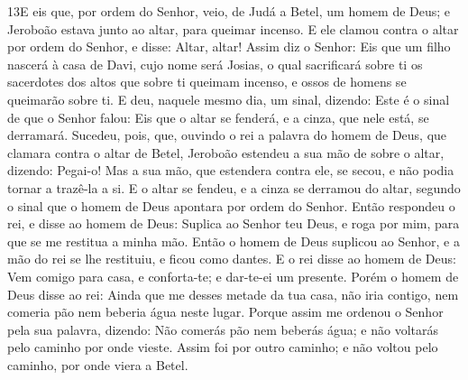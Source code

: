 \medskip

\lettrine{13} E eis que, por ordem do Senhor, veio, de Judá a
Betel, um homem de Deus; e Jeroboão estava junto ao altar, para
queimar incenso. E ele clamou contra o altar por ordem do
Senhor, e disse: Altar, altar! Assim diz o Senhor: Eis que um filho
nascerá à casa de Davi, cujo nome será Josias, o qual sacrificará
sobre ti os sacerdotes dos altos que sobre ti queimam incenso, e
ossos de homens se queimarão sobre ti. E deu, naquele mesmo dia,
um sinal, dizendo: Este é o sinal de que o Senhor falou: Eis que o
altar se fenderá, e a cinza, que nele está, se derramará.
Sucedeu, pois, que, ouvindo o rei a palavra do homem de Deus,
que clamara contra o altar de Betel, Jeroboão estendeu a sua mão de
sobre o altar, dizendo: Pegai-o! Mas a sua mão, que estendera contra
ele, se secou, e não podia tornar a trazê-la a si. E o altar se
fendeu, e a cinza se derramou do altar, segundo o sinal que o homem
de Deus apontara por ordem do Senhor. Então respondeu o rei, e
disse ao homem de Deus: Suplica ao Senhor teu Deus, e roga por mim,
para que se me restitua a minha mão. Então o homem de Deus suplicou
ao Senhor, e a mão do rei se lhe restituiu, e ficou como dantes.
E o rei disse ao homem de Deus: Vem comigo para casa, e
conforta-te; e dar-te-ei um presente. Porém o homem de Deus
disse ao rei: Ainda que me desses metade da tua casa, não iria
contigo, nem comeria pão nem beberia água neste lugar. Porque
assim me ordenou o Senhor pela sua palavra, dizendo: Não comerás pão
nem beberás água; e não voltarás pelo caminho por onde vieste.
Assim foi por outro caminho; e não voltou pelo caminho, por
onde viera a Betel.

